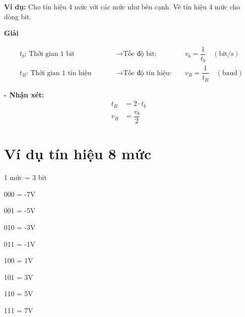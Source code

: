 \noindent\textbf{Ví dụ: }Cho tín hiệu 4 mức với các mức như bên cạnh. Vẽ tín hiệu 4 mức cho dòng bit.

\begin{center}
    
\end{center}

\begin{center}
    \textbf{Giải}
\end{center}

\begin{center}
    
\end{center}

\[
    \begin{alignedat}{3}
        &t_b\text{: Thời gian 1 bit}
        &&\qquad\rightarrow \text{Tốc độ bit: }
        &&v_b = \dfrac{1}{t_b}\quad(\text{bit/s})\\[6pt]
        &t_B\text{: Thời gian 1 tín hiệu}
        &&\qquad\rightarrow \text{Tốc độ tín hiệu: }
        &&v_B = \dfrac{1}{t_B}\quad(\text{baud})
    \end{alignedat}
\]

\textbf{- Nhận xét:} 
\[
    \boxed{ 
        \begin{aligned}
            t_B &= 2 \cdot t_b \\[6pt]
            v_B &= \dfrac{v_b}{2}
        \end{aligned}
    }
\]

\section{Ví dụ tín hiệu 8 mức}
1 mức = 3 bit

\noindent\hspace*{1.5cm} 000 = -7V

\noindent\hspace*{1.5cm} 001 = -5V

\noindent\hspace*{1.5cm} 010 = -3V

\noindent\hspace*{1.5cm} 011 = -1V

\noindent\hspace*{1.5cm} 100 = 1V

\noindent\hspace*{1.5cm} 101 = 3V

\noindent\hspace*{1.5cm} 110 = 5V

\noindent\hspace*{1.5cm} 111 = 7V

